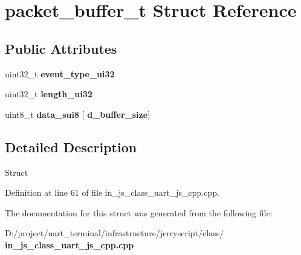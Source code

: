 \section{packet\+\_\+buffer\+\_\+t Struct Reference}
\label{structpacket__buffer__t}
\subsection*{Public Attributes}
\begin{DoxyCompactItemize}
\item 
\mbox{\label{structpacket__buffer__t_af22529f005e9077983ff061e6336c05e}} 
uint32\+\_\+t {\bfseries event\+\_\+type\+\_\+ui32}
\item 
\mbox{\label{structpacket__buffer__t_a0978c65eb5668ea7dbaeb7383093b78d}} 
uint32\+\_\+t {\bfseries length\+\_\+ui32}
\item 
\mbox{\label{structpacket__buffer__t_a9650a9f7dbe7e3cb7f27a97a202e5391}} 
uint8\+\_\+t {\bfseries data\+\_\+sui8} [\textbf{ d\+\_\+buffer\+\_\+size}]
\end{DoxyCompactItemize}


\subsection{Detailed Description}
Struct 

Definition at line 61 of file in\+\_\+js\+\_\+class\+\_\+uart\+\_\+js\+\_\+cpp.\+cpp.



The documentation for this struct was generated from the following file\+:\begin{DoxyCompactItemize}
\item 
D\+:/project/uart\+\_\+terminal/infrastructure/jerryscript/class/\textbf{ in\+\_\+js\+\_\+class\+\_\+uart\+\_\+js\+\_\+cpp.\+cpp}\end{DoxyCompactItemize}
